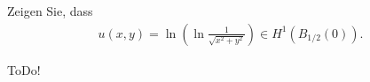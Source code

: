 
\begin{exercise}

  Zeigen Sie, dass
  \begin{align*}
      u(x, y) = \ln\left(\ln \frac{1}{\sqrt{x^2 + y^2}}\right) \in H^1(B_{1/2}(0)).
  \end{align*}

\end{exercise}


\begin{solution}

ToDo!

\end{solution}

